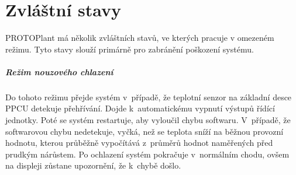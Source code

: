 \chapter*{Zvláštní stavy}
PROTOPlant má několik zvláštních stavů, ve kterých pracuje v omezeném režimu.
Tyto stavy slouží primárně pro zabránění poškození systému.

\paragraph{Režim nouzového chlazení}
\label{paragraph:CoolingMode}
Do tohoto režimu přejde systém v~případě, že teplotní senzor na základní desce PPCU detekuje přehřívání. 
Dojde k~automatickému vypnutí výstupů řídící jednotky.
Poté se systém restartuje, aby vyloučil chybu softwaru.
V~případě, že softwarovou chybu nedetekuje, vyčká, než se teplota sníží na běžnou provozní hodnotu, kterou průběžně vypočítává z~průměrů hodnot naměřených před prudkým nárůstem.
Po ochlazení systém pokračuje v~normálním chodu, ovšem na displeji zůstane upozornění, že k~chybě došlo.

\newpage